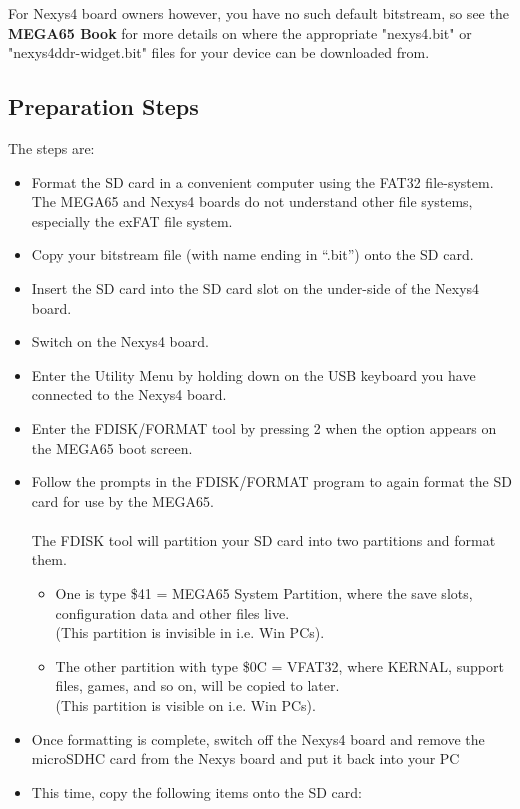 For Nexys4 board owners however, you have no such default bitstream, so
see
the {\bf MEGA65 Book}
for more details on where the appropriate "nexys4.bit" or "nexys4ddr-widget.bit" files for your device can be downloaded from.

\subsection{Preparation Steps}

The steps are:

\begin{itemize}
  \item{Format the SD card} in a convenient computer using the FAT32 file-system.  The MEGA65 and Nexys4 boards do not understand other
file systems, especially the exFAT file system.
\item{Copy} your bitstream file (with name ending in ``.bit'') onto the SD card.
\item{Insert} the SD card into the SD card slot on the under-side of the Nexys4 board.
\item{Switch on} the Nexys4 board.
\item{Enter the Utility Menu} by holding  down on the USB keyboard you have connected to the Nexys4 board.
\item{Enter the FDISK/FORMAT tool} by pressing 2 when the option appears on the MEGA65 boot screen.
\item{Follow the prompts} in the FDISK/FORMAT program to again format the SD card for use by the MEGA65. \\
  \\
  The FDISK tool will partition your SD card into two partitions and format them.
  \begin{itemize}
    \item One is type \$41 = MEGA65 System Partition, where the save slots, configuration data and other files live. \\
  (This partition is invisible in i.e. Win PCs).
    \item The other partition with type \$0C = VFAT32, where KERNAL, support files, games, and so on, will be copied to later. \\
  (This partition is visible on i.e. Win PCs).
  \end{itemize}
\item{Once formatting is complete}, switch off the Nexys4 board and remove the microSDHC card from the Nexys board and put it back into your PC
\item{This time, copy} the following items onto the SD card:

\end{itemize}
